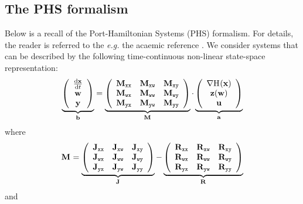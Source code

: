 \documentclass[10pt,a4paper]{article}
\begin{document}
\subsection{The PHS formalism}
%
Below is a recall of the Port-Hamiltonian Systems (PHS) formalism.
%
For details, the reader is referred to the \textit{e.g.} the acaemic reference \cite{falaize2016apassive}.
%
%
We consider systems that can be described by the following time-continuous non-linear state-space representation:
%
%
\begin{equation}
\underbrace{\left(
\begin{array}{c}
\D{\vx}{t}\\
\vw\\
\vy
\end{array}
\right)}_{\vec b}
=
\underbrace{\left(\begin{array}{lll}
\M{xx}&\M{xw} & \M{xy}\\ 
\M{wx}&\M{ww} & \M{wy}\\ 
\M{yx}&\M{yw} & \M{yy}
\end{array}\right)}_{\M{}}
\cdot
\underbrace{\left(
\begin{array}{c}
\dxH{}(\vx)\\
\vz(\vw)\\
\vu
\end{array}
\right)
}_{\vec a}
\end{equation}
%
where 
\begin{equation}
\M{}
=
\underbrace{\left(\begin{array}{lll}
\J{xx}&\J{xw} & \J{xy}\\ 
\J{wx}&\J{ww} & \J{wy}\\ 
\J{yx}&\J{yw} & \J{yy}
\end{array}\right)}_{\J{}}
-
\underbrace{\left(\begin{array}{lll}
\R{xx}&\R{xw} & \R{xy}\\ 
\R{wx}&\R{ww} & \R{wy}\\ 
\R{yx}&\R{yw} & \R{yy}
\end{array}\right)}_{\R{}}
\end{equation}
%
and
%
\end{document}
